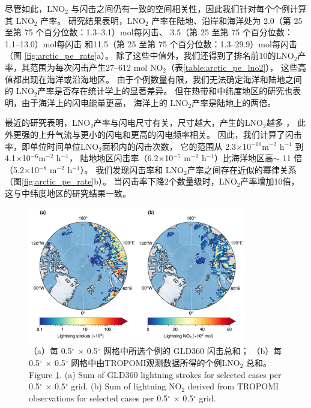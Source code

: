 尽管如此，LNO$_2$ 与闪击之间仍有一致的空间相关性，因此我们针对每个个例计算其 LNO$_2$ 产率。
研究结果表明，LNO$_2$ 产率在陆地、沿岸和海洋处为 2.0（第 25 至第 75 个百分位数：1.3--3.1）mol每闪击、
3.5（第 25 至第 75 个百分位数：1.1--13.0）mol每闪击
和11.5（第 25 至第 75 个百分位数：1.3--29.9）mol每闪击（图 \ref{fig:arctic_pe_rate}a）。
除了这些中值外，我们还得到了排名前10的LNO$_2$产率，其范围为每次闪击产生27--612 mol NO$_2$（表\ref{table:arctic_pe_lno2}），
这些高值都出现在海洋或沿海地区。
由于个例数量有限，我们无法确定海洋和陆地之间的 LNO$_2$产率是否存在统计学上的显著差异。
但在热带和中纬度地区的研究也表明，由于海洋上的闪电能量更高\citep{Beirle.2014,Hutchins.2013}，
海洋上的 LNO$_2$产率是陆地上的两倍\citep{Marais.2018,Allen.2019,Bucsela.2019}。

最近的研究表明，LNO$_2$产率与闪电尺寸有关，尺寸越大，产生的LNO$_2$越多 \citep{Huntrieser.2008,Marais.2018}，
此外更强的上升气流与更小的闪电和更高的闪电频率相关\citep{Bruning.2013,Bruning.2015,Mecikalski.2015}。
因此，我们计算了闪击率，即单位时间单位LNO$_2$面积内的闪击次数，
它的范围从 2.3$\times$10$^{-10} $m$^{-2}$ h$^{-1}$ 到 4.1$\times$10$^{-6} $m$^{-2 }$ h$^{-1}$，
陆地地区闪击率（6.2$\times$10$^{-7}$ m$^{-2}$ h$^{-1}$）比海洋地区高$\sim$ 11 倍（5.2$\times$10$^{-8}$ m$^{-2}$ h$^{-1}$）。
我们发现闪击率和 LNO$_2$产率之间存在近似的幂律关系（图\ref{fig:arctic_pe_rate}b）。
当闪击率下降2个数量级时，LNO$_2$产率增加10倍，这与中纬度地区的研究结果一致\citep{Bucsela.2019,Zhang.2020b}。


\begin{figure}[H]
\centering
\includegraphics[width=0.85\textwidth]{./figures/arctic_lno2_production.png}
\caption{
（a）每 0.5$^{\circ}$ $\times$ 0.5$^{\circ}$ 网格中所选个例的 GLD360 闪击总和；
（b）每 0.5$^{\circ}$ $\times$ 0.5$^{\circ}$ 网格中由TROPOMI观测数据所得的个例LNO$_2$ 总和。\\
Figure \ref{fig:arctic_lno2_production}. (a) Sum of GLD360 lightning strokes for selected cases per 0.5$^{\circ}$ $\times$ 0.5$^{\circ}$ grid.
(b) Sum of lightning NO$_2$ derived from TROPOMI observations for selected cases per 0.5$^{\circ}$ $\times$ 0.5$^{\circ}$ grid.
}
\label{fig:arctic_lno2_production}
\end{figure}


